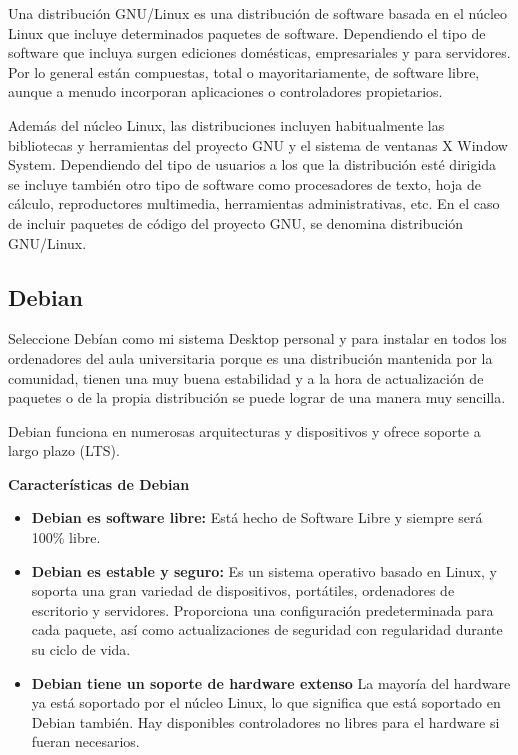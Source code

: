 			Una distribución GNU/Linux es una distribución de software basada en el núcleo Linux que incluye determinados paquetes de software. Dependiendo el tipo de software que incluya surgen ediciones domésticas, empresariales y para servidores. Por lo general están compuestas, total o mayoritariamente, de software libre, aunque a menudo incorporan aplicaciones o controladores propietarios.\par
			
			Además del núcleo Linux, las distribuciones incluyen habitualmente las bibliotecas y herramientas del proyecto GNU y el sistema de ventanas X Window System. Dependiendo del tipo de usuarios a los que la distribución esté dirigida se incluye también otro tipo de software como procesadores de texto, hoja de cálculo, reproductores multimedia, herramientas administrativas, etc. En el caso de incluir paquetes de código del proyecto GNU, se denomina distribución GNU/Linux.\par
			
			
		\subsection{Debian}\label{sub:debian}
			
			Seleccione Debían como mi sistema Desktop personal y para instalar en todos los ordenadores del aula universitaria porque es una distribución mantenida por la comunidad, tienen una muy buena estabilidad y a la hora de actualización de paquetes o de la propia distribución se puede lograr de una manera muy sencilla.\par 
			
			Debian funciona en numerosas arquitecturas y dispositivos y ofrece soporte a largo plazo (LTS).\par\vspace{0.2cm}
			
			\textbf{Características de Debian}\par\vspace{0.3cm}
			
			\begin{itemize}
				
				\item \textbf{Debian es software libre:} Está hecho de Software Libre y siempre será 100\% libre.\par
				
				\item \textbf{Debian es estable y seguro:} Es un sistema operativo basado en Linux, y soporta una gran variedad de dispositivos, portátiles, ordenadores de escritorio y servidores. Proporciona una configuración predeterminada para cada paquete, así como actualizaciones de seguridad con regularidad durante su ciclo de vida.\par
				
				\item \textbf{Debian tiene un soporte de hardware extenso} La mayoría del hardware ya está soportado por el núcleo Linux, lo que significa que está soportado en Debian también. Hay disponibles controladores no libres para el hardware si fueran necesarios. 
							
			\end{itemize}	
		
